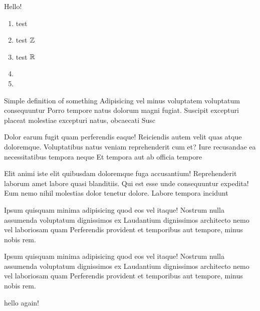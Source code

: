 \documentclass{article}
\begin{document}
    \maketitle[small]
    Hello!
    \begin{enumerate}[label=\listAlphP]
        \item test \nsN{}
        \item test \(\mathbb{Z}{}\)
        \item test \(\mathbb{R}{}\)
        \item {}
        \item {}
    \end{enumerate}
    \begin{definition}
        Simple definition of something Adipisicing vel minus voluptatem voluptatum consequuntur Porro tempore natus dolorum magni fugiat. Suscipit excepturi placeat molestiae excepturi natus, obcaecati Susc
    \end{definition}
    \begin{theorem}
        Dolor earum fugit quam perferendis eaque! Reiciendis autem velit quas atque doloremque. Voluptatibus natus veniam reprehenderit cum et? Iure recusandae ea necessitatibus tempora neque Et tempora aut ab officia tempore
    \end{theorem}
    \begin{lemma}
        Elit animi iste elit quibusdam doloremque fuga accusantium! Reprehenderit laborum amet labore quasi blanditiis. Qui est esse unde consequuntur expedita! Eum nemo nihil molestias dolor tenetur dolore. Labore tempora incidunt
    \end{lemma}
    \begin{corollary}
        Ipsum quisquam minima adipisicing quod eos vel itaque! Nostrum nulla assumenda voluptatum dignissimos ex Laudantium dignissimos architecto nemo vel laboriosam quam Perferendis provident et temporibus aut tempore, minus nobis rem.
    \end{corollary}
    \begin{proposition}
        Ipsum quisquam minima adipisicing quod eos vel itaque! Nostrum nulla assumenda voluptatum dignissimos ex Laudantium dignissimos architecto nemo vel laboriosam quam Perferendis provident et temporibus aut tempore, minus nobis rem.
    \end{proposition}
    \newpage{}
    hello again!
\end{document}
